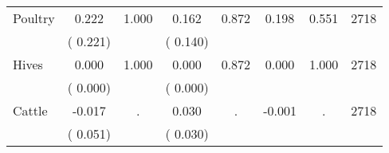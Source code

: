 \begin{tabular}{l*{7}{c}}
 Poultry       &              0.222       &        1.000  &              0.162       &        0.872  &              0.198       &              0.551 &  2718 \\ 
                       &       (       0.221)             &                               &       (       0.140)                     &                               &                                               &                                &                      \\ 

 Hives       &              0.000       &        1.000  &              0.000       &        0.872  &              0.000       &              1.000 &  2718 \\ 
                       &       (       0.000)             &                               &       (       0.000)                     &                               &                                               &                                &                      \\ 

 Cattle       &             -0.017       &            .  &              0.030       &            .  &             -0.001       &                  . &  2718 \\ 
                       &       (       0.051)             &                               &       (       0.030)                     &                               &                                               &                                &                      \\ 

\hline \end{tabular}